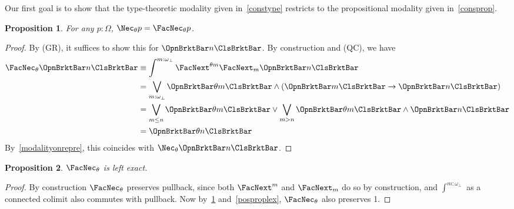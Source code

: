 \documentclass[a4paper,10pt]{amsart}
\newtheorem{proposition}{Proposition}[section]
\theoremstyle{definition}
\newcommand{\ass}[1]{\OpnBrktBar#1\ClsBrktBar}
\newcommand{\ovob}{\omega_\bot}
\newcommand{\bx}{\FacNec}
\newcommand{\bbx}{\Nec}
\newcommand{\opm}[1]{\FacNext_{#1}}
\newcommand{\upm}[1]{\FacNext^{#1}}
\begin{document}
Our first goal is to show that the type-theoretic modality given in~\cref{constype} restricts to the propositional modality given in~\cref{consprop}.

\begin{proposition}\label{twoconscoin}
  For any $p\colon\Omega$, $\bbx_\theta p = \bx_\theta p$.
\end{proposition}
\begin{proof}
  By (GR), it suffices to show this for $\ass n$. By construction and (QC), we have
  \begin{align*}
    \bx_\theta\ass n 
    &\equiv \int^{m:\ovob}\upm{\theta m}\opm m \ass n \\ 
    &= \bigvee_{m:\ovob}\ass{\theta m} \wedge (\ass m \to \ass n) \\
    &= \bigvee_{m\le n}\ass{\theta m} \vee \bigvee_{m > n} \ass{\theta m} \wedge \ass n \\
    &= \ass{\theta n}
  \end{align*}
  By~\cref{modalityonrepre}, this coincides with $\bbx_\theta\ass n$. 
\end{proof}

\begin{proposition}
  $\bx_\theta$ is left exact.
\end{proposition}
\begin{proof}
  By construction $\bx_\theta$ preserves pullback, since both $\upm{m}$ and $\opm m$ do so by construction, and $\int^{m:\ovob}$ as a connected colimit also commutes with pullback. Now by~\cref{twoconscoin} and~\cref{posproplex}, $\bx_\theta$ also preserves 1.
\end{proof}
\end{document}
